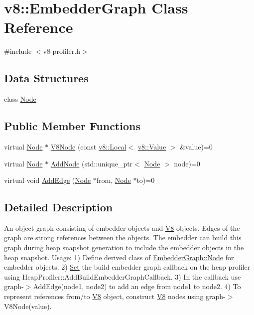 \hypertarget{classv8_1_1EmbedderGraph}{}\section{v8\+:\+:Embedder\+Graph Class Reference}
\label{classv8_1_1EmbedderGraph}


{\ttfamily \#include $<$v8-\/profiler.\+h$>$}

\subsection*{Data Structures}
\begin{DoxyCompactItemize}
\item 
class \mbox{\hyperlink{classv8_1_1EmbedderGraph_1_1Node}{Node}}
\end{DoxyCompactItemize}
\subsection*{Public Member Functions}
\begin{DoxyCompactItemize}
\item 
virtual \mbox{\hyperlink{classv8_1_1EmbedderGraph_1_1Node}{Node}} $\ast$ \mbox{\hyperlink{classv8_1_1EmbedderGraph_a6fdb5451611738dd44c70d195445d0ff}{V8\+Node}} (const \mbox{\hyperlink{classv8_1_1Local}{v8\+::\+Local}}$<$ \mbox{\hyperlink{classv8_1_1Value}{v8\+::\+Value}} $>$ \&value)=0
\item 
virtual \mbox{\hyperlink{classv8_1_1EmbedderGraph_1_1Node}{Node}} $\ast$ \mbox{\hyperlink{classv8_1_1EmbedderGraph_a57afbce6126e5cd82b66f66b018a18e2}{Add\+Node}} (std\+::unique\+\_\+ptr$<$ \mbox{\hyperlink{classv8_1_1EmbedderGraph_1_1Node}{Node}} $>$ node)=0
\item 
virtual void \mbox{\hyperlink{classv8_1_1EmbedderGraph_a1625dcd91021c6de5f039952c9d220d6}{Add\+Edge}} (\mbox{\hyperlink{classv8_1_1EmbedderGraph_1_1Node}{Node}} $\ast$from, \mbox{\hyperlink{classv8_1_1EmbedderGraph_1_1Node}{Node}} $\ast$to)=0
\end{DoxyCompactItemize}


\subsection{Detailed Description}
An object graph consisting of embedder objects and \mbox{\hyperlink{classv8_1_1V8}{V8}} objects. Edges of the graph are strong references between the objects. The embedder can build this graph during heap snapshot generation to include the embedder objects in the heap snapshot. Usage\+: 1) Define derived class of \mbox{\hyperlink{classv8_1_1EmbedderGraph_1_1Node}{Embedder\+Graph\+::\+Node}} for embedder objects. 2) \mbox{\hyperlink{classv8_1_1Set}{Set}} the build embedder graph callback on the heap profiler using Heap\+Profiler\+::\+Add\+Build\+Embedder\+Graph\+Callback. 3) In the callback use graph-\/$>$Add\+Edge(node1, node2) to add an edge from node1 to node2. 4) To represent references from/to \mbox{\hyperlink{classv8_1_1V8}{V8}} object, construct \mbox{\hyperlink{classv8_1_1V8}{V8}} nodes using graph-\/$>$V8\+Node(value). 

